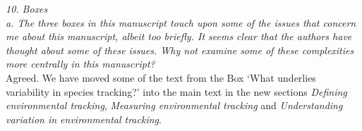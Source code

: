 \documentclass[11pt]{article}
\begin{document}
\emph{10.     Boxes\\
a.      The three boxes in this manuscript touch upon some of the issues that concern me
about this manuscript, albeit too briefly. It seems clear that the authors have thought about
some of these issues. Why not examine some of these complexities more centrally in this
manuscript?}\\

Agreed. We have moved some of the text from the Box `What underlies variability in species tracking?' into the main text in the new sections \emph{Defining environmental tracking}, \emph{Measuring environmental tracking} and \emph{Understanding variation in environmental tracking}.

\newpage


\end{document}
